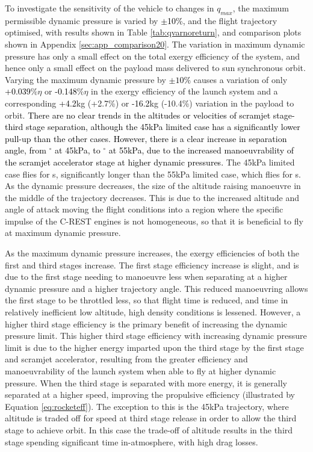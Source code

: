 \noindent
To investigate the sensitivity of the vehicle to changes in $q_{max}$, the maximum permissible dynamic pressure is varied by \textcolor{black}{$\pm$10\%}, and the flight trajectory optimised, with results shown in Table \ref{tab:qvarnoreturn}, and comparison plots shown in Appendix \ref{sec:app_comparison20}.
The variation in maximum dynamic pressure has only a small effect on the total exergy efficiency of the system, and hence only a small effect on the payload mass delivered to sun synchronous orbit.  Varying the maximum dynamic pressure by \textcolor{black}{$\pm10\%$} causes a variation of only \textcolor{black}{+0.039}\%$\eta$ or \textcolor{black}{-0.148}\%$\eta$ in the exergy efficiency of the launch system and a corresponding \textcolor{black}{+4.2}kg (+2.7\%) or \textcolor{black}{-16.2}kg (-10.4\%) variation in the payload to orbit.  
\textcolor{black}{There are no clear trends in the altitudes or velocities of scramjet stage-third stage separation, although the 45kPa limited case has a significantly lower pull-up than the other cases. However, there is a clear increase in separation angle, from \secondthirdSeparationgammaqFortyFiveNoReturn $^\circ$ at 45kPa, to \secondthirdSeparationgammaqFiftyFiveNoReturn $^\circ$ at 55kPa, due to the increased manoeuvrability of the scramjet accelerator stage at higher dynamic pressures. }
The 45kPa limited case flies for \secondFlightTimeqFortyFiveNoReturn s, significantly longer than the 55kPa limited case, which flies for \secondFlightTimeqFiftyFiveNoReturn s.
As the dynamic pressure decreases, the size of the altitude raising manoeuvre in the middle of the trajectory decreases. This is due to the increased altitude and angle of attack moving the flight conditions into a region where the specific impulse of the C-REST engines is not homogeneous, so that it is beneficial to fly at maximum dynamic pressure.  

As the maximum dynamic pressure increases, the exergy efficiencies of both the first and third stages increase. The first stage efficiency increase is slight, and is due to the first stage needing to manoeuvre less when separating at a higher dynamic pressure and a higher trajectory angle. This reduced manoeuvring allows the first stage to be throttled less, so that flight time is reduced, and time in relatively inefficient low altitude, high density conditions is lessened. However, a higher third stage efficiency is the primary benefit of increasing the dynamic pressure limit. This higher third stage efficiency with increasing dynamic pressure limit is due to the higher energy imparted upon the third stage by the first stage and scramjet accelerator, resulting from the greater efficiency and manoeuvrability of the launch system when able to fly at higher dynamic pressure. When the third stage is separated with more energy, it is generally separated at a higher speed, improving the propulsive efficiency (illustrated by Equation \ref{eq:rocketeff}). The exception to this is the 45kPa trajectory, where altitude is traded off for speed at third stage release in order to allow the third stage to achieve orbit. In this case the trade-off of altitude results in the third stage spending significant time in-atmosphere, with high drag losses. 



